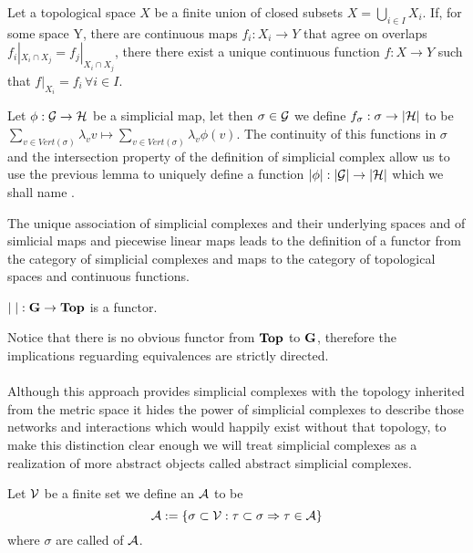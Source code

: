 \documentclass[../1.tex]{subfiles}
\begin{document}
    \begin{lem}
        Let a topological space $X$ be a finite union of closed subsets $X = \bigcup_{i \in I} X_i$. If, for some space Y, there are continuous
        maps $f_i : X_i \to Y$ that agree on overlaps $f_i |_{X_i \cap X_j} = f_j |_{X_i \cap X_j}$, there there exist a unique continuous
        function $f : X \to Y$ such that $f |_{X_i} = f_i \, \forall i \in I$.
    \end{lem}

    \begin{defn}
        Let $\phi : \mathcal{G} \to \mathcal{H}$ be a simplicial map, let then $\sigma \in \mathcal{G}$ we define $f_\sigma : \sigma \to |\mathcal{H}|$ to be 
        $\sum_{v \in Vert(\sigma)} \lambda_v v \mapsto \sum_{v \in Vert(\sigma)} \lambda_v \phi(v)$. The continuity of this functions in $\sigma$ and the
        intersection property of the definition of simplicial complex allow us to use the previous lemma to uniquely define a function $|\phi| : |\mathcal{G}| \to |\mathcal{H}|$
        which we shall name .
    \end{defn}

    The unique association of simplicial complexes and their underlying spaces and of simlicial maps and piecewise linear maps leads to the definition
    of a functor from the category of simplicial complexes and maps to the category of topological spaces and continuous functions.

    \begin{thm}
        $|\;| : \textbf{G} \to \textbf{Top}$ is a functor.
    \end{thm}

    Notice that there is no obvious functor from $\textbf{Top}$ to $\textbf{G}$, therefore the implications reguarding equivalences are strictly directed.\\
    \hfill \\
    Although this approach provides simplicial complexes with the topology inherited from the metric space it hides the power of simplicial complexes 
    to describe those networks and interactions which would happily exist without that topology, to make this distinction clear enough we will treat
    simplicial complexes as a realization of more abstract objects called abstract simplicial complexes.
    
    \begin{defn}
        Let $\mathcal{V}$ be a finite set we define an  $\mathcal{A}$ to be 
        \[\mathcal{A}:=\{ \sigma  \subset \mathcal{V} : \tau \subset \sigma \Rightarrow \tau \in \mathcal{A} \}\] 
        where $\sigma$ are called  of $\mathcal{A}$.
    \end{defn}
    
\end{document}
